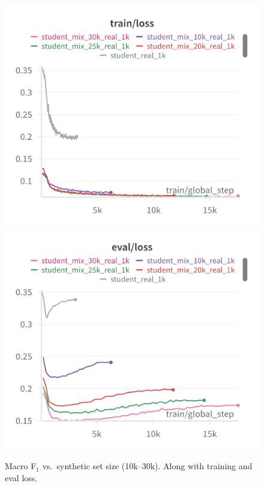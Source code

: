 \documentclass[11pt]{article}
\begin{document}
\begin{figure}[htbp]
  \includegraphics[width=\linewidth]{figures/student_size/student_train_loss.png}
  \endminipage\hfill
  \includegraphics[width=\linewidth]{figures/student_size/student_eval_loss.png}
  \endminipage
  \caption{Macro F$_1$ vs.\ synthetic set size (10k--30k). Along with
  training and eval loss.}
  \label{fig:size-curve}
\end{figure}
\end{document}

